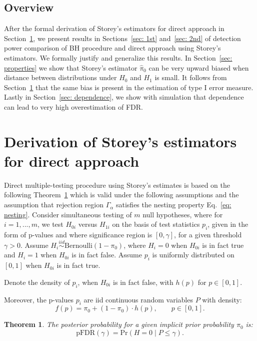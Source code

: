 \documentclass[10pt]{article}
\newtheorem{theorem}{Theorem}
\begin{document}
\subsection{Overview}
After the formal derivation of Storey's estimators for direct approach in Section~\ref{sec: estimates}, we present results in Sections~\ref{sec: 1st} and~\ref{sec: 2nd} of detection power comparison of BH procedure and direct approach using Storey's estimators. We formally justify and generalize this results. In Section~\ref{sec: properties} we show that Storey's estimator $\widehat{\pi}_{0}$ can be very upward biased when distance between distributions under $H_{0}$ and $H_{1}$ is small. It follows from Section~\ref{sec: estimates} that the same bias is present in the estimation of type I error measure. Lastly in Section~\ref{sec: dependence}, we show with simulation that dependence can lead to very high overestimation of FDR. 


\section{Derivation of Storey's estimators for direct approach} \label{sec: estimates}

Direct multiple-testing procedure using Storey's estimates is based on the following Theorem~\ref{thm: pFDR} which is valid under the following assumptions and the assumption that rejection region $\Gamma_{\alpha}$ satisfies the nesting property Eq.~\ref{eq: nesting}. Consider simultaneous testing of $m$ null hypotheses, where for $i = 1, ..., m$, we test $H_{0i}$ versus $H_{1i}$ on the basis of test statistics $p_{i}$, given in the form of p-values and where significance region is $[0, \gamma]$, for a given threshold $\gamma > 0$. Assume $H_{i} \stackrel{iid}{\sim} \text{Bernoulli}(1 - \pi_{0})$, where $H_{i} = 0$ when $H_{0i}$ is in fact true and $H_{i} = 1$ when $H_{0i}$ is in fact false. Assume $p_{i}$ is uniformly distributed on $[0,1]$ when $H_{0i}$ is in fact true. 
	
Denote the density of $p_{i}$, when $H_{0i}$ is in fact false, with $h(p)$ for $p \in [0, 1]$. 

Moreover, the p-values $p_{i}$ are iid continuous random variables $P$ with density:
\begin{equation}
f(p) = \pi_{0} + (1 - \pi_{0}) \cdot h(p), \qquad p \in [0,1].
\end{equation}

\begin{theorem} \label{thm: pFDR}
The posterior probability for a given implicit prior probability $\pi_{0}$ is:
	\begin{equation}
	\text{pFDR}(\gamma) = \text{Pr}(H = 0 \mid P \leq \gamma).
	\end{equation}
\end{theorem}
\end{document}
